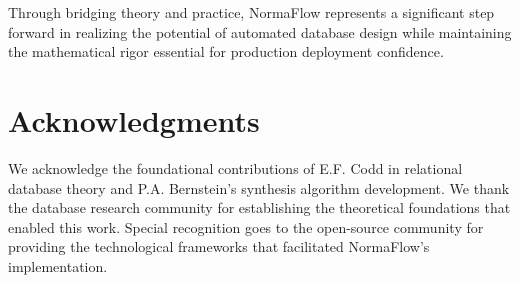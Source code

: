 \documentclass[acmsmall]{acmart}
\begin{document}
Through bridging theory and practice, NormaFlow represents a significant step forward in realizing the potential of automated database design while maintaining the mathematical rigor essential for production deployment confidence.

\section*{Acknowledgments}

We acknowledge the foundational contributions of E.F. Codd in relational database theory and P.A. Bernstein's synthesis algorithm development. We thank the database research community for establishing the theoretical foundations that enabled this work. Special recognition goes to the open-source community for providing the technological frameworks that facilitated NormaFlow's implementation.



\end{document}
